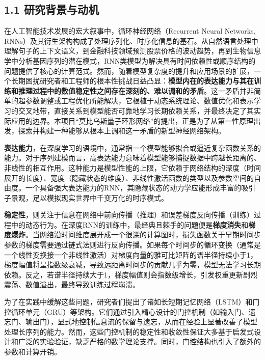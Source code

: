 \documentclass[
  12pt,
]{article}
\begin{document}
\hypertarget{ux7814ux7a76ux80ccux666fux4e0eux52a8ux673a}{%
\subsection{1.1
研究背景与动机}\label{ux7814ux7a76ux80ccux666fux4e0eux52a8ux673a}}

在人工智能技术发展的宏大叙事中，循环神经网络（Recurrent Neural Networks,
RNNs）及其衍生架构构成了处理序列化、时序化信息的基石。从自然语言处理中理解句子的上下文语义，到金融科技领域预测股票价格的波动趋势，再到生物信息学中分析基因序列的潜在模式，RNN类模型为解决具有时间依赖性或顺序结构的问题提供了核心的计算范式。然而，随着模型复杂度的提升和应用场景的扩展，一个长期困扰研究者和工程师的根本性挑战日益凸显：\textbf{模型内在的表达能力与其在训练和推理过程中的数值稳定性之间存在深刻的、难以调和的矛盾}。这一矛盾并非简单的超参数调整或工程优化所能解决，它根植于动态系统理论、数值优化和表示学习的交叉地带，直接关系到模型能否可靠地学习长期依赖关系，并最终决定了其实际应用的边界。本项目``莫比乌斯量子环形网络''的提出，正是为了从第一性原理出发，探索并构建一种能够从根本上调和这一矛盾的新型神经网络架构。

\textbf{表达能力}，在深度学习的语境中，通常指一个模型能够拟合或逼近复杂函数关系的能力。对于序列建模而言，高表达能力意味着模型能够捕捉数据中跨越长距离的、非线性的相互作用。这种能力是模型性能的上限，它依赖于网络结构的深度（时间展开的长度）、宽度（隐藏状态的维度）、非线性激活函数的类型以及参数空间的自由度。一个具备强大表达能力的RNN，其隐藏状态的动力学应能形成丰富的吸引子景观，足以模拟现实世界中千变万化的时序模式。

\textbf{稳定性}，则关注于信息在网络中前向传播（推理）和误差梯度反向传播（训练）过程中的动态行为。在深度RNN的训练中，最经典且棘手的问题便是\textbf{梯度消失}和\textbf{梯度爆炸}。当网络沿时间维度展开成一个很深的计算图时，损失函数关于早期时间步参数的梯度需要通过链式法则进行反向传播。如果每个时间步的循环变换（通常是一个线性变换接一个非线性激活）对梯度向量的雅可比矩阵的谱半径持续小于1，梯度幅值将呈指数级衰减，导致远距离时间步的贡献几乎为零，模型无法学习长期依赖。反之，若谱半径持续大于1，梯度幅值则会指数级增长，引发权重更新剧烈震荡、数值溢出，最终导致训练过程崩溃。

为了在实践中缓解这些问题，研究者们提出了诸如长短期记忆网络（LSTM）和门控循环单元（GRU）等架构。它们通过引入精心设计的门控机制（如输入门、遗忘门、输出门），显式地控制信息流的保留与遗忘，从而在经验上显著改善了模型处理长序列的能力。然而，这些门控机制的稳定性和收敛性保证大多基于启发式设计和广泛的实验验证，缺乏严格的数学理论支撑。同时，门控结构也引入了额外的参数和计算开销。
\end{document}
